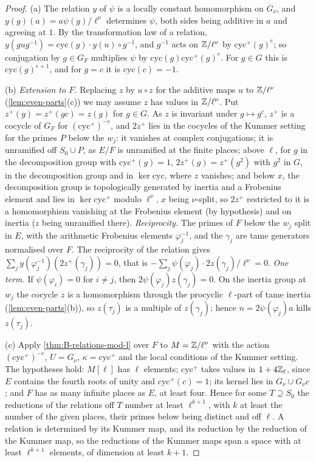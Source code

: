 \begin{proof}
(a) The relation $y$ of $\psi$ is a locally constant homomorphism on $G_\nu$, and $y(g)(a)=a\psi(g)/\ell^\nu$ determines $\psi$, both sides being additive in $a$ and agreeing at $1$. By the transformation law of a relation,
$y(gug^{-1})=\mathrm{cyc}(g)\cdot y(u)\circ g^{-1}$, and $g^{-1}$ acts on $\mathbb{Z}/\ell^\nu$ by $\mathrm{cyc}^+(g)^e$; so conjugation by $g\in G_F$ multiplies $\psi$ by $\mathrm{cyc}(g)\mathrm{cyc}^+(g)^e$. For $g\in G$ this is $\mathrm{cyc}(g)^{e+1}$, and for $g=c$ it is $\mathrm{cyc}(c)=-1$.

(b) \emph{Extension to $F$.} Replacing $z$ by $u\circ z$ for the additive maps $u$ to $\mathbb{Z}/\ell^\nu$ (\cref{lem:even-parts}(c)) we may assume $z$ has values in $\mathbb{Z}/\ell^\nu$. Put $z^+(g)=z^+(gc)=z(g)$ for $g\in G$. As $z$ is invariant under $g\mapsto g^c$, $z^+$ is a cocycle of
$G_F$ for $(\mathrm{cyc}^+)^{-e}$, and $2z^+$ lies in the cocycles of the Kummer setting for the primes $P$ below the $w_j$: it vanishes at complex conjugations; it is unramified off $S_0\cup P$, as $E/F$ is unramified at the finite places;
above $\ell$, for $g$ in the decomposition group with $\mathrm{cyc}^+(g)=1$, $2z^+(g)=z^+(g^2)$ with $g^2$ in $G$, in the decomposition group and in $\ker\mathrm{cyc}$, where $z$ vanishes; and below $x$, the decomposition group is topologically
generated by inertia and a Frobenius element and lies in $\ker\mathrm{cyc}^+$ modulo $\ell^\nu$, $x$ being $\nu$-split, so $2z^+$ restricted to it is a homomorphism vanishing at the Frobenius element (by hypothesis) and on inertia ($z$ being
unramified there). \emph{Reciprocity.} The primes of $F$ below the $w_j$ split in $E$, with the arithmetic Frobenius elements $\varphi_j^{-1}$, and the $\gamma_j$ are tame generators normalised over $F$. The reciprocity of the relation gives
$\sum_jy(\varphi_j^{-1})(2z^+(\gamma_j))=0$, that is $-\sum_j\psi(\varphi_j)\cdot2z(\gamma_j)/\ell^\nu=0$. \emph{One term.} If $\psi(\varphi_i)=0$ for $i\ne j$, then $2\psi(\varphi_j)z(\gamma_j)=0$. On the inertia group at $w_j$ the cocycle $z$ is a homomorphism
through the procyclic $\ell$-part of tame inertia (\cref{lem:even-parts}(b)), so $z(\tau_j)$ is a multiple of $z(\gamma_j)$; hence $n=2\psi(\varphi_j)a$ kills $z(\tau_j)$.

(c) Apply \cref{thm:B-relations-mod-l} over $F$ to $M=\mathbb{Z}/\ell^\nu$ with the action $(\mathrm{cyc}^+)^{-e}$, $U=G_\nu$, $\kappa=\mathrm{cyc}^+$ and the local conditions of the Kummer setting. The hypotheses hold: $M[\ell]$ has $\ell$ elements; $\mathrm{cyc}^+$ takes
values in $1+4\mathbb{Z}_\ell$, since $E$ contains the fourth roots of unity and $\mathrm{cyc}^+(c)=1$; its kernel lies in $G_\nu\cup G_\nu c$; and $F$ has as many infinite places as $E$, at least four. Hence for some $T\supseteq S_0$ the reductions of the relations
off $T$ number at least $\ell^{k+1}$, with $k$ at least the number of the given places, their primes below being distinct and off $\ell$. A relation is determined by its Kummer map, and its reduction by the reduction of the Kummer map,
so the reductions of the Kummer maps span a space with at least $\ell^{k+1}$ elements, of dimension at least $k+1$.
\end{proof}

